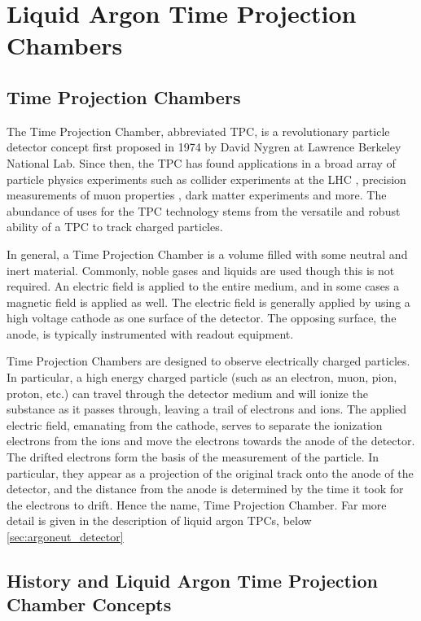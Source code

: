 \chapter{\label{chp:lartpcs} Liquid Argon Time Projection Chambers}

\section{Time Projection Chambers}

The Time Projection Chamber, abbreviated TPC, is a revolutionary particle detector concept first proposed in 1974 by David Nygren at Lawrence Berkeley National Lab.  Since then, the TPC has found applications in a broad array of particle physics experiments such as collider experiments at the LHC \cite{Lippmann:2104844,Aamodt:2008zz}, precision measurements of muon properties \cite{Luo:2015oca}, dark matter experiments \cite{Akerib:2012ys,Aprile:2011dd} and more.  The abundance of uses for the TPC technology stems from the versatile and robust ability of a TPC to track charged particles.

In general, a Time Projection Chamber is a volume filled with some neutral and inert material.  Commonly, noble gases and liquids are used though this is not required.  An electric field is applied to the entire medium, and in some cases a magnetic field is applied as well.  The electric field is generally applied by using a high voltage cathode as one surface of the detector.  The opposing surface, the anode, is typically instrumented with readout equipment.

Time Projection Chambers are designed to observe electrically charged particles.  In particular, a high energy charged particle (such as an electron, muon, pion, proton, etc.) can travel through the detector medium and will ionize the substance as it passes through, leaving a trail of electrons and ions.  The applied electric field, emanating from the cathode, serves to separate the ionization electrons from the ions and move the electrons towards the anode of the detector.  The drifted electrons form the basis of the measurement of the particle.  In particular, they appear as a projection of the original track onto the anode of the detector, and the distance from the anode is determined by the time it took for the electrons to drift.  Hence the name, Time Projection Chamber.  Far more detail is given in the description of liquid argon TPCs, below \ref{sec:argoneut_detector}

\section{History and Liquid Argon Time Projection Chamber Concepts}

